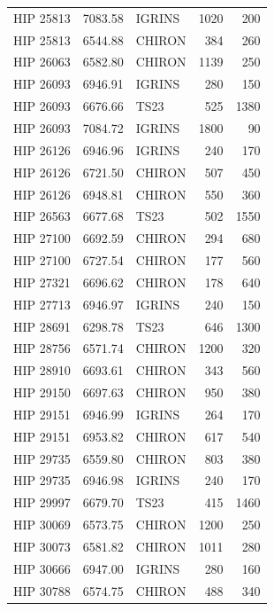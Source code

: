 {\begin{scriptsize}
\begin{longtable}{|l|rlrr|}
   HIP 25813 &  7083.58 &     IGRINS &     1020 &   200 \\
   HIP 25813 &  6544.88 &     CHIRON &      384 &   260 \\
   HIP 26063 &  6582.80 &     CHIRON &     1139 &   250 \\
   HIP 26093 &  6946.91 &     IGRINS &      280 &   150 \\
   HIP 26093 &  6676.66 &       TS23 &      525 &  1380 \\
   HIP 26093 &  7084.72 &     IGRINS &     1800 &    90 \\
   HIP 26126 &  6946.96 &     IGRINS &      240 &   170 \\
   HIP 26126 &  6721.50 &     CHIRON &      507 &   450 \\
   HIP 26126 &  6948.81 &     CHIRON &      550 &   360 \\
   HIP 26563 &  6677.68 &       TS23 &      502 &  1550 \\
   HIP 27100 &  6692.59 &     CHIRON &      294 &   680 \\
   HIP 27100 &  6727.54 &     CHIRON &      177 &   560 \\
   HIP 27321 &  6696.62 &     CHIRON &      178 &   640 \\
   HIP 27713 &  6946.97 &     IGRINS &      240 &   150 \\
   HIP 28691 &  6298.78 &       TS23 &      646 &  1300 \\
   HIP 28756 &  6571.74 &     CHIRON &     1200 &   320 \\
   HIP 28910 &  6693.61 &     CHIRON &      343 &   560 \\
   HIP 29150 &  6697.63 &     CHIRON &      950 &   380 \\
   HIP 29151 &  6946.99 &     IGRINS &      264 &   170 \\
   HIP 29151 &  6953.82 &     CHIRON &      617 &   540 \\
   HIP 29735 &  6559.80 &     CHIRON &      803 &   380 \\
   HIP 29735 &  6946.98 &     IGRINS &      240 &   170 \\
   HIP 29997 &  6679.70 &       TS23 &      415 &  1460 \\
   HIP 30069 &  6573.75 &     CHIRON &     1200 &   250 \\
   HIP 30073 &  6581.82 &     CHIRON &     1011 &   280 \\
   HIP 30666 &  6947.00 &     IGRINS &      280 &   160 \\
   HIP 30788 &  6574.75 &     CHIRON &      488 &   340 \\

\end{longtable}
\end{scriptsize}}
